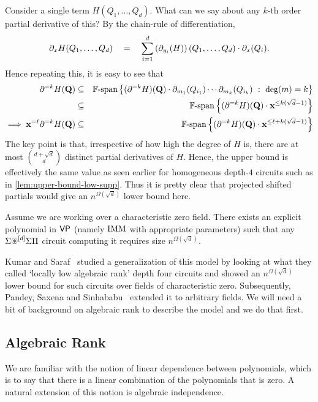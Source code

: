 Consider a single term $H(Q_1,\ldots, Q_d)$. What can we say about any $k$-th order partial derivative of this? By the chain-rule of differentiation,
\[
\partial_{x} H(Q_1,\ldots, Q_d) \quad = \quad  \sum_{i=1}^d \left(\partial_{y_i}(H)\right)(Q_1,\ldots, Q_d) \cdot \partial_x(Q_i). 
\]
Hence repeating this, it is easy to see that 
\begin{eqnarray*}
\partial^{=k} H(\mathbf{Q}) &\subseteq& \operatorname{\mathbb{F}\text{-span}} \left\{{(\partial^{=k}H)(\mathbf{Q}) \cdot \partial_{m_1}(Q_{i_1}) \cdots \partial_{m_k}(Q_{i_k})}\ : \ {\deg(m) = k}\right\}\\
& \subseteq & \operatorname{\mathbb{F}\text{-span}}\left\{(\partial^{=k}H)(\mathbf{Q}) \cdot \mathbf{x}^{\leq k(\sqrt{d}-1)}\right\}\\
\implies \mathbf{x}^{=\ell}\partial^{=k} H(\mathbf{Q}) & \subseteq & \operatorname{\mathbb{F}\text{-span}}\left\{(\partial^{=k}H)(\mathbf{Q}) \cdot \mathbf{x}^{\leq \ell + k(\sqrt{d}-1)}\right\}
\end{eqnarray*}
The key point is that, irrespective of how high the degree of $H$ is, there are at most $\binom{d+\sqrt{d}}{d}$ distinct partial derivatives of $H$.
Hence, the upper bound is effectively the same value as seen earlier for homogeneous depth-$4$ circuits such as in \autoref{lem:upper-bound-low-supp}.
Thus it is pretty clear that projected shifted partials would give an $n^{\Omega(\sqrt{d})}$ lower bound here. 

\begin{observation}\label{obs:locally-low-algRank-warmup}
Assume we are working over a characteristic zero field. There exists an explicit polynomial in $\mathsf{VP}$ (namely $\operatorname{\mathrm{IMM}}$ with appropriate parameters) such that any $\Sigma\circast^{[d]}\Sigma\Pi$ circuit computing it requires size $n^{\Omega(\sqrt{d})}$. 
\end{observation}

Kumar and Saraf~\cite{KS16lowrank} studied a generalization of this model by looking at what they called `locally low algebraic rank' depth four circuits and showed an $n^{\Omega(\sqrt{d})}$ lower bound for such circuits over fields of characteristic zero. Subsequently, Pandey, Saxena and Sinhababu~\cite{PSS16} extended it to arbitrary fields. We will need a bit of background on algebraic rank to describe the model and we do that first. 

\subsection{Algebraic Rank}

We are familiar with the notion of linear dependence between polynomials, which is to say that there is a linear combination of the polynomials that is zero. A natural extension of this notion is algebraic independence. 


